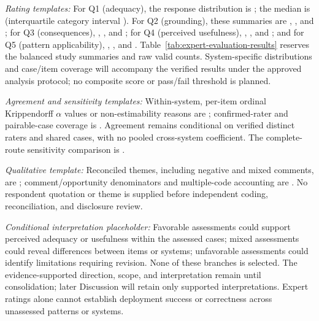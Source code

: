 \emph{Rating templates:} For Q1 (adequacy), the response distribution is
\ExpertQOneDistributionTBD{}; the median is \ExpertQOneMedianTBD{}
(interquartile category interval \ExpertQOneIQRTBD{}).
For Q2 (grounding), these summaries are \ExpertQTwoDistributionTBD{},
\ExpertQTwoMedianTBD{}, and \ExpertQTwoIQRTBD{};
for Q3 (consequences), \ExpertQThreeDistributionTBD{},
\ExpertQThreeMedianTBD{}, and \ExpertQThreeIQRTBD{};
for Q4 (perceived usefulness), \ExpertQFourDistributionTBD{},
\ExpertQFourMedianTBD{}, and \ExpertQFourIQRTBD{};
and for Q5 (pattern applicability), \ExpertQFiveDistributionTBD{},
\ExpertQFiveMedianTBD{}, and \ExpertQFiveIQRTBD{}.
Table~\ref{tab:expert-evaluation-results} reserves the balanced study
summaries and raw valid counts. System-specific distributions and
case/item coverage will accompany the verified results under the approved
analysis protocol; no composite score or pass/fail threshold is planned.

\emph{Agreement and sensitivity templates:} Within-system, per-item
ordinal Krippendorff $\alpha$ values or non-estimability reasons are
\ExpertAgreementTBD{}; confirmed-rater and pairable-case coverage is
\ExpertAgreementCoverageTBD{}. Agreement remains conditional on verified
distinct raters and shared cases, with no pooled cross-system coefficient.
The complete-route sensitivity comparison is \ExpertSensitivityTBD{}.

\emph{Qualitative template:} Reconciled themes, including negative and
mixed comments, are \ExpertQualitativeThemesTBD{}; comment/opportunity
denominators and multiple-code accounting are \ExpertCommentCoverageTBD{}.
No respondent quotation or theme is supplied before independent coding,
reconciliation, and disclosure review.

\emph{Conditional interpretation placeholder:} Favorable assessments
could support perceived adequacy or usefulness within the assessed cases;
mixed assessments could reveal differences between items or systems;
unfavorable assessments could identify limitations requiring revision.
None of these branches is selected. The evidence-supported direction,
scope, and interpretation remain \ExpertInterpretationTBD{} until
consolidation; later Discussion will retain only supported interpretations.
Expert ratings alone cannot establish deployment success or correctness
across unassessed patterns or systems.
